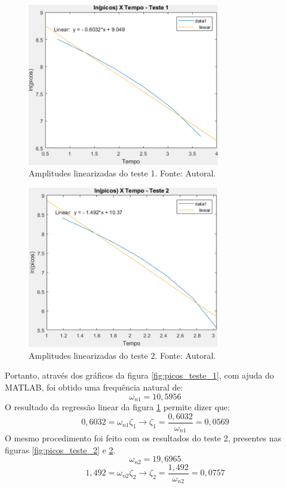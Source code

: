 \documentclass{ifacconf}
\begin{document}
\begin{figure}[!htb]
  \begin{center}
  \includegraphics[width=8.4cm]{figures/regressao_teste_1.png}    %
  \caption{Amplitudes linearizadas do teste 1. Fonte: Autoral.} 
  \label{fig:regressao_teste_1}
  \end{center}
\end{figure}

\begin{figure}[!htb]
  \begin{center}
  \includegraphics[width=8.4cm]{figures/regressao_teste_2.png}    %
  \caption{Amplitudes linearizadas do teste 2. Fonte: Autoral.} 
  \label{fig:regressao_teste_2}
  \end{center}
\end{figure}

Portanto, através dos gráficos da figura \ref{fig:picos_teste_1}, com ajuda do MATLAB, foi obtido uma frequência
natural de:
\begin{equation}
  \omega_{n1} = 10,5956
\end{equation}
O resultado da regressão linear da figura \ref{fig:regressao_teste_1} permite dizer que:
\begin{equation}
  0,6032 = \omega_{n1} \zeta_1  \rightarrow  \zeta_1 = \frac{0,6032}{\omega_{n1}} = 0,0569
\end{equation}
O mesmo procedimento foi feito com os resultados do teste 2, presentes nas figuras \ref{fig:picos_teste_2} e \ref{fig:regressao_teste_2}.
\begin{equation}
  \omega_{n2} = 19,6965
\end{equation}
\begin{equation}
  1,492 = \omega_{n2} \zeta_2  \rightarrow  \zeta_2 = \frac{1,492}{\omega_{n2}} = 0,0757
\end{equation}
\end{document}
